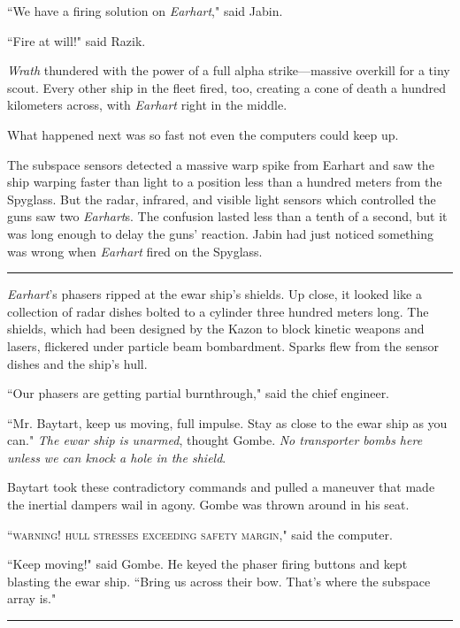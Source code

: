 \documentclass[twoside,letterpaper,12pt]{memoir}
\begin{document}
``We have a firing solution on \textit{Earhart}," said Jabin.

``Fire at will!" said Razik.

\textit{Wrath} thundered with the power of a full alpha strike---massive overkill for a tiny scout. Every other ship in the fleet fired, too, creating a cone of death a hundred kilometers across, with \textit{Earhart} right in the middle.

What happened next was so fast not even the computers could keep up.

The subspace sensors detected a massive warp spike from Earhart and saw the ship warping faster than light to a position less than a hundred meters from the Spyglass. But the radar, infrared, and visible light sensors which controlled the guns saw two \textit{Earhart}s. The confusion lasted less than a tenth of a second, but it was long enough to delay the guns' reaction. Jabin had just noticed something was wrong when \textit{Earhart} fired on the Spyglass.

\begin{center}\rule{3cm}{0.4 pt}\end{center}

\textit{Earhart}'s phasers ripped at the ewar ship's shields. Up close, it looked like a collection of radar dishes bolted to a cylinder three hundred meters long. The shields, which had been designed by the Kazon to block kinetic weapons and lasers, flickered under particle beam bombardment. Sparks flew from the sensor dishes and the ship's hull.

``Our phasers are getting partial burnthrough," said the chief engineer.

``Mr. Baytart, keep us moving, full impulse. Stay as close to the ewar ship as you can." \textit{The ewar ship is unarmed}, thought Gombe. \textit{No transporter bombs here unless we can knock a hole in the shield}.

Baytart took these contradictory commands and pulled a maneuver that made the inertial dampers wail in agony. Gombe was thrown around in his seat.

``\textsc{warning! hull stresses exceeding safety margin}," said the computer.

``Keep moving!" said Gombe. He keyed the phaser firing buttons and kept blasting the ewar ship. ``Bring us across their bow. That's where the subspace array is."

\begin{center}\rule{3cm}{0.4 pt}\end{center}
\end{document}
